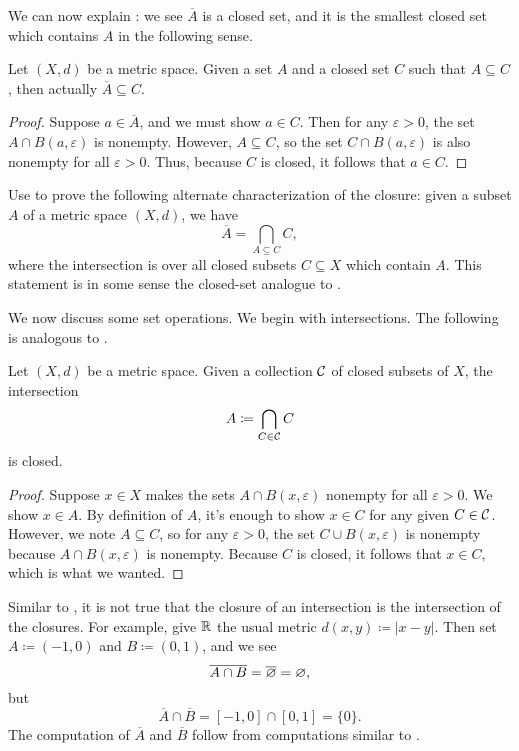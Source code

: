 \documentclass[../main.tex]{subfiles}
\begin{document}
We can now explain : we see $\overline A$ is a closed set, and it is the smallest closed set which contains $A$ in the following sense.
\begin{proposition} \label{prop:cl-is-smallest-closed}
    Let $(X,d)$ be a metric space. Given a set $A$ and a closed set $C$ such that $A\subseteq C$, then actually $\overline A\subseteq C$.
\end{proposition}
\begin{proof}
    Suppose $a\in\overline A$, and we must show $a\in C$. Then for any $\varepsilon>0$, the set $A\cap B(a,\varepsilon)$ is nonempty. However, $A\subseteq C$, so the set $C\cap B(a,\varepsilon)$ is also nonempty for all $\varepsilon>0$. Thus, because $C$ is closed, it follows that $a\in C$.
\end{proof}
\begin{exe} \label{exe:cl-is-intersection-closed}
    Use  to prove the following alternate characterization of the closure: given a subset $A$ of a metric space $(X,d)$, we have
    \[\overline A=\bigcap_{A\subseteq C}C,\]
    where the intersection is over all closed subsets $C\subseteq X$ which contain $A$. This statement is in some sense the closed-set analogue to .
\end{exe}
We now discuss some set operations. We begin with intersections. The following is analogous to .
\begin{proposition} \label{prop:intersect-closed-sets}
    Let $(X,d)$ be a metric space. Given a collection $\mathcal{C}$ of closed subsets of $X$, the intersection
    \[A\coloneqq\bigcap_{C\in\mathcal{C}}C\]
    is closed.
\end{proposition}
\begin{proof}
    Suppose $x\in X$ makes the sets $A\cap B(x,\varepsilon)$ nonempty for all $\varepsilon>0$. We show $x\in A$. By definition of $A$, it's enough to show $x\in C$ for any given $C\in\mathcal{C}$. However, we note $A\subseteq C$, so for any $\varepsilon>0$, the set $C\cup B(x,\varepsilon)$ is nonempty because $A\cap B(x,\varepsilon)$ is nonempty. Because $C$ is closed, it follows that $x\in C$, which is what we wanted.
\end{proof}
\begin{example}
    Similar to , it is not true that the closure of an intersection is the intersection of the closures. For example, give $\mathbb R$ the usual metric $d(x,y)\coloneqq|x-y|$. Then set $A\coloneqq(-1,0)$ and $B\coloneqq(0,1)$, and we see
    \[\overline{A\cap B}=\overline{\varnothing}=\varnothing,\]
    but
    \[\overline A\cap\overline B=[-1,0]\cap[0,1]=\{0\}.\]
    The computation of $\overline A$ and $\overline B$ follow from computations similar to .
\end{example}
\end{document}
